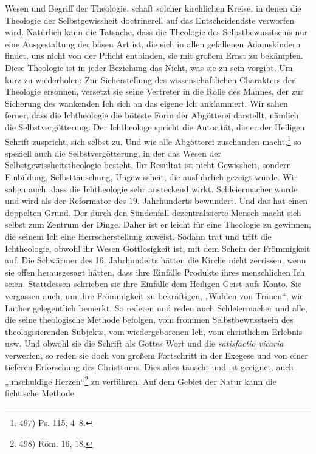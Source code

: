 Wesen und Begriff der Theologie. schaft solcher kirchlichen Kreise, in denen die Theologie der Selbstgewissheit doctrinerell auf das Entscheidendste verworfen wird. Natürlich kann die Tatsache, dass die Theologie des Selbstbewusstseins nur eine Ausgestaltung der bösen Art ist, die sich in allen gefallenen Adamskindern findet, uns nicht von der Pflicht entbinden, sie mit großem Ernst zu bekämpfen. Diese Theologie ist in jeder Beziehung das Nicht, was sie zu sein vorgibt. Um kurz zu wiederholen: Zur Sicherstellung des wissenschaftlichen Charakters der Theologie ersonnen, versetzt sie seine Vertreter in die Rolle des Mannes, der zur Sicherung des wankenden Ich sich an das eigene Ich anklammert. Wir sahen ferner, dass die Ichtheologie die böteste Form der Abgötterei darstellt, nämlich die Selbstvergötterung. Der Ichtheologe spricht die Autorität, die er der Heiligen Schrift zuspricht, sich selbst zu. Und wie alle Abgötterei zuschanden macht,\footnote{497) Ps. 115, 4--8.} so speziell auch die Selbstvergötterung, in der das Wesen der Selbstgewissheitstheologie besteht. Ihr Resultat ist nicht Gewissheit, sondern Einbildung, Selbsttäuschung, Ungewissheit, die ausführlich gezeigt wurde. Wir sahen auch, dass die Ichtheologie sehr ansteckend wirkt. Schleiermacher wurde und wird als der Reformator des 19. Jahrhunderts bewundert. Und das hat einen doppelten Grund. Der durch den Sündenfall dezentralisierte Mensch macht sich selbst zum Zentrum der Dinge. Daher ist er leicht für eine Theologie zu gewinnen, die seinem Ich eine Herrscherstellung zuweist. Sodann trat und tritt die Ichtheologie, obwohl ihr Wesen Gottlosigkeit ist, mit dem Schein der Frömmigkeit auf. Die Schwärmer des 16. Jahrhunderts hätten die Kirche nicht zerrissen, wenn sie offen herausgesagt hätten, dass ihre Einfälle Produkte ihres menschlichen Ich seien. Stattdessen schrieben sie ihre Einfälle dem Heiligen Geist aufs Konto. Sie vergassen auch, um ihre Frömmigkeit zu bekräftigen, „Wulden von Tränen“, wie Luther gelegentlich bemerkt. So redeten und reden auch Schleiermacher und alle, die seine theologische Methode befolgen, vom frommen Selbstbewusstsein des theologisierenden Subjekts, vom wiedergeborenen Ich, vom christlichen Erlebnis usw. Und obwohl sie die Schrift als Gottes Wort und die \textit{satisfactio vicaria} verwerfen, so reden sie doch von großem Fortschritt in der Exegese und von einer tieferen Erforschung des Christtums. Dies alles täuscht und ist geeignet, auch „unschuldige Herzen“\footnote{498) Röm. 16, 18.} zu verführen. Auf dem Gebiet der Natur kann die fichtische Methode